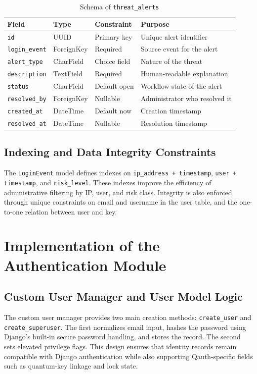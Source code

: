 \documentclass[12pt,a4paper]{report}
\begin{document}
\begin{table}[H]
\centering
\small
\caption{Schema of \texttt{threat\_alerts}}
\label{tab:threat-alerts}
\begin{tabular}{|p{3.0cm}|p{2.8cm}|p{1.8cm}|p{6.0cm}|}
\hline
\textbf{Field} & \textbf{Type} & \textbf{Constraint} & \textbf{Purpose} \\
\hline
\texttt{id} & UUID & Primary key & Unique alert identifier \\
\hline
\texttt{login\_event} & ForeignKey & Required & Source event for the alert \\
\hline
\texttt{alert\_type} & CharField & Choice field & Nature of the threat \\
\hline
\texttt{description} & TextField & Required & Human-readable explanation \\
\hline
\texttt{status} & CharField & Default open & Workflow state of the alert \\
\hline
\texttt{resolved\_by} & ForeignKey & Nullable & Administrator who resolved it \\
\hline
\texttt{created\_at} & DateTime & Default now & Creation timestamp \\
\hline
\texttt{resolved\_at} & DateTime & Nullable & Resolution timestamp \\
\hline
\end{tabular}
\end{table}

\subsection{Indexing and Data Integrity Constraints}
The \texttt{LoginEvent} model defines indexes on \texttt{ip\_address + timestamp}, \texttt{user + timestamp}, and \texttt{risk\_level}. These indexes improve the efficiency of administrative filtering by IP, user, and risk class. Integrity is also enforced through unique constraints on email and username in the user table, and the one-to-one relation between user and key.

\section{Implementation of the Authentication Module}

\subsection{Custom User Manager and User Model Logic}
The custom user manager provides two main creation methods: \texttt{create\_user} and \texttt{create\_superuser}. The first normalizes email input, hashes the password using Django's built-in secure password handling, and stores the record. The second sets elevated privilege flags. This design ensures that identity records remain compatible with Django authentication while also supporting Qauth-specific fields such as quantum-key linkage and lock state.
\end{document}
